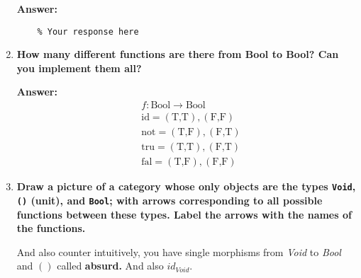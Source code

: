 \documentclass{article}
\begin{document}
\begin{enumerate}
	      \textbf{Answer:}
	      \begin{verbatim}
    % Your response here
    \end{verbatim}

	\item \textbf{How many different functions are there from Bool to Bool? Can you implement them all?}

	      \textbf{Answer:}
	      \begin{align*}
		       & f : \text{Bool} \to \text{Bool}          \\
		       & \text{id} = (\text{T,T}) , (\text{F,F})  \\
		       & \text{not} = (\text{T,F}) , (\text{F,T}) \\
		       & \text{tru} = (\text{T,T}) , (\text{F,T}) \\
		       & \text{fal} = (\text{T,F}) , (\text{F,F})
	      \end{align*}

	\item \textbf{Draw a picture of a category whose only objects are the types \texttt{Void}, \texttt{()} (unit), and \texttt{Bool}; with arrows corresponding to all possible functions between these types. Label the arrows with the names of the functions.}


	      And also counter intuitively, you have single morphisms from \textit{Void}  to \textit{Bool } and $ () $ called \textbf{absurd.} And also $ id_{\textit{Void}}$.
\end{enumerate}
\end{document}
